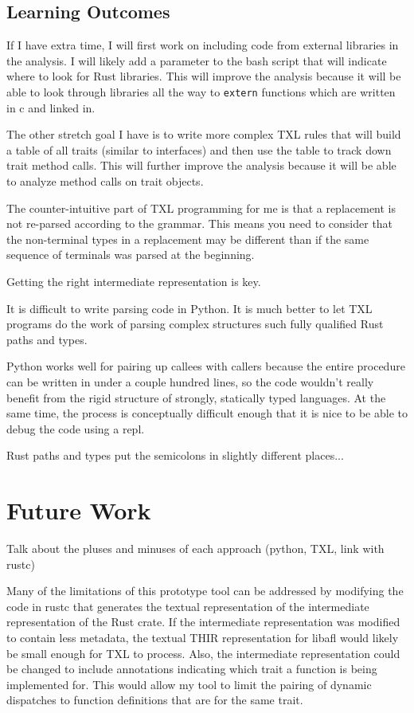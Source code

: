 \documentclass[11pt]{article}
\begin{document}
\subsection{Learning Outcomes}
If I have extra time, I will first work on including code from external libraries in the analysis.
I will likely add a parameter to the bash script that will indicate where to look for Rust libraries.
This will improve the analysis because it will be able to look through libraries all the way to \lstinline{extern} functions which are written in c and linked in.

The other stretch goal I have is to write more complex TXL rules that will build a table of all traits (similar to interfaces) and then use the table to track down trait method calls.
This will further improve the analysis because it will be able to analyze method calls on trait objects.

The counter-intuitive part of TXL programming for me is that a replacement is not re-parsed according to the grammar.
This means you need to consider that the non-terminal types in a replacement may be different than if the same sequence of terminals was parsed at the beginning.

Getting the right intermediate representation is key.

It is difficult to write parsing code in Python.
It is much better to let TXL programs do the work of parsing complex structures such fully qualified Rust paths and types.

Python works well for pairing up callees with callers because the entire procedure can be written in under a couple hundred lines, so the code wouldn't really benefit from the rigid structure of strongly, statically typed languages.
At the same time, the process is conceptually difficult enough that it is nice to be able to debug the code using a repl.

Rust paths and types put the semicolons in slightly different places...

\section{Future Work}

Talk about the pluses and minuses of each approach (python, TXL, link with rustc)

Many of the limitations of this prototype tool can be addressed by modifying the code in rustc that generates the textual representation of the intermediate representation of the Rust crate.
If the intermediate representation was modified to contain less metadata, the textual THIR representation for libafl would likely be small enough for TXL to process.
Also, the intermediate representation could be changed to include annotations indicating which trait a function is being implemented for.
This would allow my tool to limit the pairing of dynamic dispatches to function definitions that are for the same trait.
\end{document}

